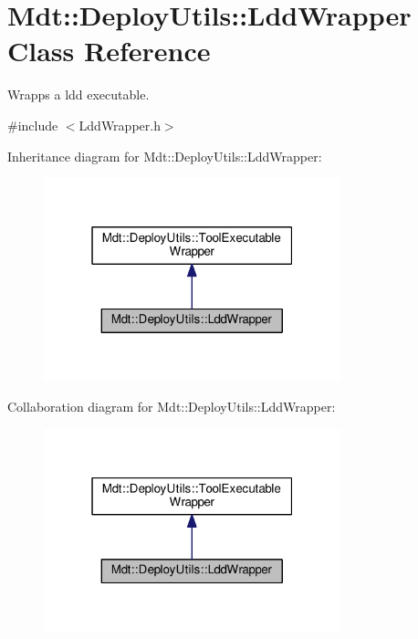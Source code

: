 \hypertarget{class_mdt_1_1_deploy_utils_1_1_ldd_wrapper}{}\section{Mdt\+:\+:Deploy\+Utils\+:\+:Ldd\+Wrapper Class Reference}
\label{class_mdt_1_1_deploy_utils_1_1_ldd_wrapper}


Wrapps a ldd executable.  




{\ttfamily \#include $<$Ldd\+Wrapper.\+h$>$}



Inheritance diagram for Mdt\+:\+:Deploy\+Utils\+:\+:Ldd\+Wrapper\+:
\nopagebreak
\begin{figure}[H]
\begin{center}
\leavevmode
\includegraphics[width=244pt]{class_mdt_1_1_deploy_utils_1_1_ldd_wrapper__inherit__graph}
\end{center}
\end{figure}


Collaboration diagram for Mdt\+:\+:Deploy\+Utils\+:\+:Ldd\+Wrapper\+:
\nopagebreak
\begin{figure}[H]
\begin{center}
\leavevmode
\includegraphics[width=244pt]{class_mdt_1_1_deploy_utils_1_1_ldd_wrapper__coll__graph}
\end{center}
\end{figure}
